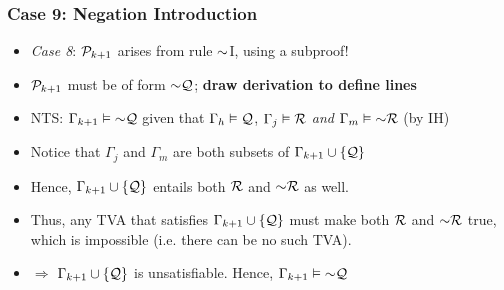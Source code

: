 \begin{frame}
\frametitle{Case 9: Negation Introduction}

\begin{itemize}[<+->]

\item \emph{Case 8}: $\mathcal{P}_{k +1}$ arises from rule $\enot${}I, using a subproof! 

\item $\mathcal{P}_{k +1}$ must be of form $\enot \metav{Q}$; \textbf{draw derivation to define lines}

\item NTS: $\Gamma_{k+1} \entails \enot \metav{Q}$ given that $\Gamma_h \vDash \mathcal{Q}$, $\Gamma_j \vDash \mathcal{R}$ \emph{and} $\Gamma_m \entails \enot \metav{R}$ (by IH)

\item Notice that $\Gamma_j$ and $\Gamma_m$ are both subsets of $\Gamma_{k+1} \cup \{ \mathcal{Q}\}$ 

\item[] Hence, $\Gamma_{k+1} \cup \{ \mathcal{Q}\}$ entails both $\mathcal{R}$ and $\enot \metav{R}$ as well. 

\item[] Thus, any TVA that satisfies $\Gamma_{k+1} \cup \{ \mathcal{Q}\}$ must make both $\mathcal{R}$ and $\enot \metav{R}$ true, which is impossible (i.e. there can be no such TVA). 
\item[] $\Rightarrow$ $\Gamma_{k+1} \cup \{ \mathcal{Q}\}$ is unsatisfiable. Hence, $\Gamma_{k+1} \entails \enot \metav{Q}$


\end{itemize}
\end{frame}


\iffalse 
\begin{frame}
\frametitle{Reminder for Josh!}

\begin{itemize}[<+->]

\item If we actually make it this far, give hints on PS12 soundness question!

\item If the people don't want these hints, then clearly they'd rather be complete!

\item ``The customer is always right!"

\item (Schematize this sentence in quantifier logic)
\end{itemize}
\end{frame}
\fi 

